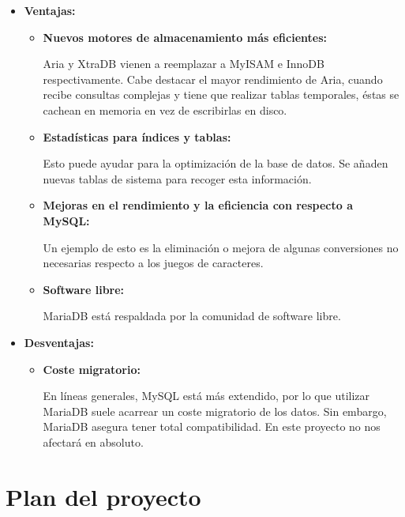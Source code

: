 \documentclass[openright,twoside,10pt]{book}
\begin{document}
    \begin{itemize}
    \item
      \textbf{Ventajas:}
      \cite{zeokat_mariadb, andergonzalez_mariadb, alidavergara_mariadb}
    
      \begin{itemize}
      \item
        \textbf{Nuevos motores de almacenamiento más eficientes:}
    
        Aria y XtraDB vienen a reemplazar a MyISAM e InnoDB respectivamente.
        Cabe destacar el mayor rendimiento de Aria, cuando recibe consultas
        complejas y tiene que realizar tablas temporales, éstas se cachean
        en memoria en vez de escribirlas en disco.
      \item
        \textbf{Estadísticas para índices y tablas:}
    
        Esto puede ayudar para la optimización de la base de datos. Se
        añaden nuevas tablas de sistema para recoger esta información.
      \item
        \textbf{Mejoras en el rendimiento y la eficiencia con respecto a
        MySQL:}
    
        Un ejemplo de esto es la eliminación o mejora de algunas
        conversiones no necesarias respecto a los juegos de caracteres.
      \item
        \textbf{Software libre:}
    
        MariaDB está respaldada por la comunidad de software libre.
      \end{itemize}
    \item
      \textbf{Desventajas:}
    
      \begin{itemize}
      \item
        \textbf{Coste migratorio:}
    
        En líneas generales, MySQL está más extendido, por lo que utilizar
        MariaDB suele acarrear un coste migratorio de los datos. Sin
        embargo, MariaDB asegura tener total compatibilidad. En este
        proyecto no nos afectará en absoluto.
      \end{itemize}
    \end{itemize}
    
    \chapter{ Plan del proyecto }
    
\end{document}

